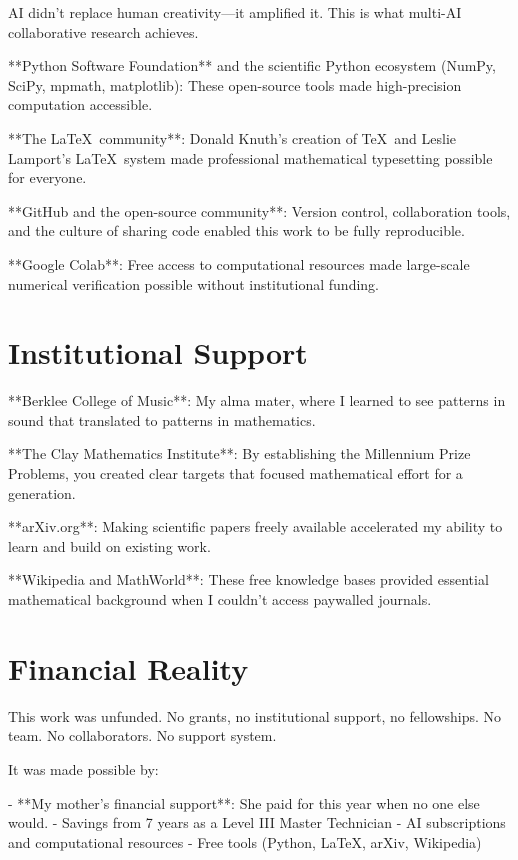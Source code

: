 AI didn't replace human creativity—it amplified it. This is what multi-AI collaborative research achieves.

**Python Software Foundation** and the scientific Python ecosystem (NumPy, SciPy, mpmath, matplotlib): These open-source tools made high-precision computation accessible.

**The \LaTeX\ community**: Donald Knuth's creation of \TeX\ and Leslie Lamport's \LaTeX\ system made professional mathematical typesetting possible for everyone.

**GitHub and the open-source community**: Version control, collaboration tools, and the culture of sharing code enabled this work to be fully reproducible.

**Google Colab**: Free access to computational resources made large-scale numerical verification possible without institutional funding.

\section*{Institutional Support}

**Berklee College of Music**: My alma mater, where I learned to see patterns in sound that translated to patterns in mathematics.

**The Clay Mathematics Institute**: By establishing the Millennium Prize Problems, you created clear targets that focused mathematical effort for a generation.

**arXiv.org**: Making scientific papers freely available accelerated my ability to learn and build on existing work.

**Wikipedia and MathWorld**: These free knowledge bases provided essential mathematical background when I couldn't access paywalled journals.

\section*{Financial Reality}

This work was unfunded. No grants, no institutional support, no fellowships. No team. No collaborators. No support system.

It was made possible by:

- **My mother's financial support**: She paid for this year when no one else would.
- Savings from 7 years as a Level III Master Technician
- AI subscriptions and computational resources
- Free tools (Python, LaTeX, arXiv, Wikipedia)

